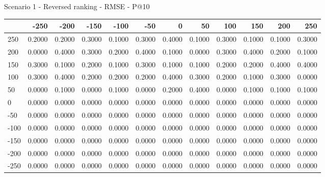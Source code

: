 Scenario 1 - Reversed ranking - RMSE - P@10
\begin{tabular}{lrrrrrrrrrrr}
\toprule
{} &   -250 &   -200 &   -150 &   -100 &   -50  &    0   &    50  &    100 &    150 &    200 &    250 \\
\midrule
 250 & 0.2000 & 0.2000 & 0.3000 & 0.1000 & 0.3000 & 0.4000 & 0.1000 & 0.3000 & 0.1000 & 0.1000 & 0.3000 \\
 200 & 0.0000 & 0.4000 & 0.3000 & 0.2000 & 0.4000 & 0.1000 & 0.0000 & 0.3000 & 0.4000 & 0.2000 & 0.1000 \\
 150 & 0.3000 & 0.1000 & 0.2000 & 0.1000 & 0.3000 & 0.1000 & 0.1000 & 0.2000 & 0.2000 & 0.4000 & 0.4000 \\
 100 & 0.3000 & 0.4000 & 0.2000 & 0.2000 & 0.2000 & 0.4000 & 0.3000 & 0.2000 & 0.1000 & 0.3000 & 0.0000 \\
 50  & 0.0000 & 0.1000 & 0.0000 & 0.1000 & 0.0000 & 0.2000 & 0.4000 & 0.0000 & 0.1000 & 0.1000 & 0.1000 \\
 0   & 0.0000 & 0.0000 & 0.0000 & 0.0000 & 0.0000 & 0.0000 & 0.0000 & 0.0000 & 0.0000 & 0.0000 & 0.0000 \\
-50  & 0.0000 & 0.0000 & 0.0000 & 0.0000 & 0.0000 & 0.0000 & 0.0000 & 0.0000 & 0.0000 & 0.0000 & 0.0000 \\
-100 & 0.0000 & 0.0000 & 0.0000 & 0.0000 & 0.0000 & 0.0000 & 0.0000 & 0.0000 & 0.0000 & 0.0000 & 0.0000 \\
-150 & 0.0000 & 0.0000 & 0.0000 & 0.0000 & 0.0000 & 0.0000 & 0.0000 & 0.0000 & 0.0000 & 0.0000 & 0.0000 \\
-200 & 0.0000 & 0.0000 & 0.0000 & 0.0000 & 0.0000 & 0.0000 & 0.0000 & 0.0000 & 0.0000 & 0.0000 & 0.0000 \\
-250 & 0.0000 & 0.0000 & 0.0000 & 0.0000 & 0.0000 & 0.0000 & 0.0000 & 0.0000 & 0.0000 & 0.0000 & 0.0000 \\
\bottomrule
\end{tabular}

